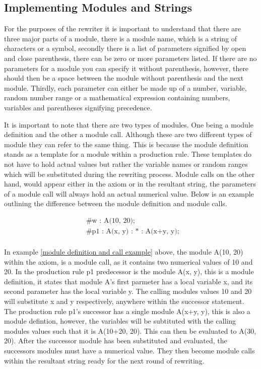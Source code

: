 \subsection{Implementing Modules and Strings} \label{modules and strings}

For the purposes of the rewriter it is important to understand that there are three major parts of a module, there is a module name, which is a string of characters or a symbol, secondly there is a list of parameters signified by open and close parenthesis, there can be zero or more parameters listed. If there are no parameters for a module you can specify it without parenthesis, however, there should then be a space between the module without parenthesis and the next module. Thirdly, each parameter can either be made up of a number, variable, random number range or a mathematical expression containing  numbers, variables and parentheses signifying precedence. 

It is important to note that there are two types of modules. One being a module definition and the other a module call. Although these are two different types of module they can refer to the same thing. This is because the module definition stands as a template for a module within a production rule. These templates do not have to hold actual values but rather the variable names or random ranges which will be substituted during the rewriting process. Module calls on the other hand, would appear either in the axiom or in the resultant string, the parameters of a module call will always hold an actual numerical value. Below is an example outlining the difference between the module definition and module calls.

\begin{equation} \label{module definition and call example}
\begin{aligned}
	&\text{\#w : A(10, 20);}\\
	&\text{\#p1 : A(x, y) : * : A(x+y, y); }\\
\end{aligned}
\end{equation}

\noindent
In example \ref{module definition and call example} above, the module A(10, 20) within the axiom, is a module call, as it contains two numerical values of 10 and 20. In the production rule p1 predecessor is the module A(x, y), this is a module definition, it states that module A's first parmeter has a local variable x, and its second parameter has the local variable y. The calling modules values 10 and 20 will substitute x and y respectively, anywhere within the successor statement. The production rule p1's successor has a single module A(x+y, y), this is also a module defintion, however, the variables will be subtituted with the calling modules values such that it is A(10+20, 20). This can then be evaluated to A(30, 20). After the successor module has been substituted and evaluated, the successors modules must have a numerical value. They then become module calls within the resultant string ready for the next round of rewriting.

